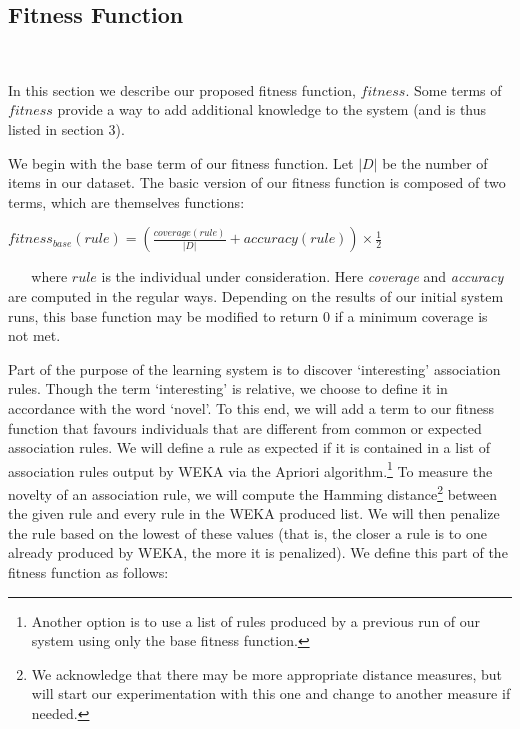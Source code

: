 \documentclass{amsart}
\theoremstyle{definition}
\theoremstyle{remark}
\numberwithin{equation}{section}
\begin{document}
\subsection{Fitness Function}
~\newline

In this section we describe our proposed fitness function, $fitness$. Some terms of $fitness$ provide a way to add additional knowledge to the system (and is thus listed in section 3).
\newline

\noindent We begin with the base term of our fitness function. Let $|D|$ be the number of items in our dataset. The basic version of our fitness function is composed of two terms, which are themselves functions:\newline
\begin{center}
$fitness_{base}(rule) =(                          \frac{coverage(rule)}{|D|} + accuracy(rule))\times\frac{1}{2}$
\end{center}
~\newline
~\newline
where $rule$ is the individual under consideration. Here \textit{coverage} and \textit{accuracy} are computed in the regular ways. Depending on the results of our initial system runs, this base function may be modified to return 0 if a minimum coverage is not met.\newline

Part of the purpose of the learning system is to discover `interesting' association rules. Though the term `interesting' is relative, we choose to define it in accordance with the word `novel'. To this end, we will add a term to our fitness function that favours individuals that are different from common or expected association rules. We will define a rule as expected if it is contained in a list of association rules output by WEKA via the Apriori algorithm.\footnote{Another option is to use a list of rules produced by a previous run of our system using only the base fitness function.} To measure the novelty of an association rule, we will compute the Hamming distance\footnote{We acknowledge that there may be more appropriate distance measures, but will start our experimentation with this one and change to another measure if needed.} between the given rule and every rule in the WEKA produced list. We will then penalize the rule based on the lowest of these values (that is, the closer a rule is to one already produced by WEKA, the more it is penalized). We define this part of the fitness function as follows:\newline
\end{document}
